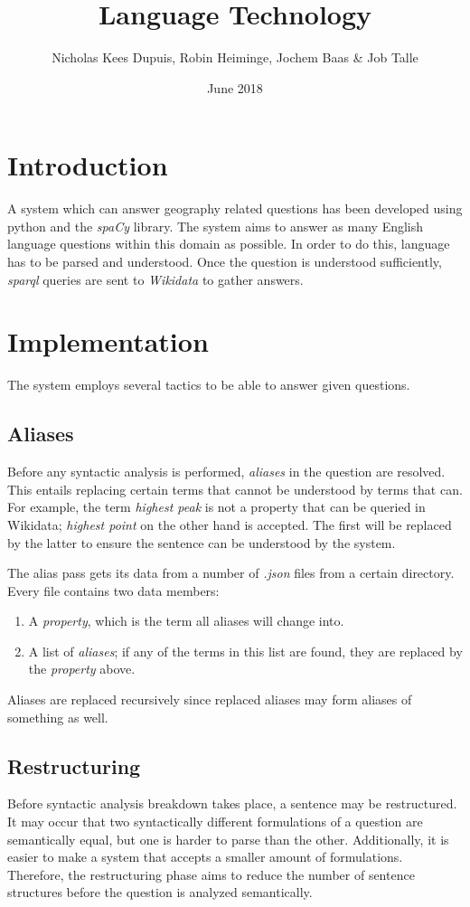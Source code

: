 \documentclass{article}
\title{Language Technology}
\author{Nicholas Kees Dupuis, Robin Heiminge, Jochem Baas \& Job Talle}
\date{June 2018}
\begin{document}
\maketitle

\section{Introduction}
A system which can answer geography related questions has been developed using python and the \emph{spaCy} library. The system aims to answer as many English language questions within this domain as possible. In order to do this, language has to be parsed and understood. Once the question is understood sufficiently, \emph{sparql} queries are sent to \emph{Wikidata} to gather answers.

\section{Implementation}
The system employs several tactics to be able to answer given questions.

\subsection{Aliases}
Before any syntactic analysis is performed, \emph{aliases} in the question are resolved. This entails replacing certain terms that cannot be understood by terms that can. For example, the term \emph{highest peak} is not a property that can be queried in Wikidata; \emph{highest point} on the other hand is accepted. The first will be replaced by the latter to ensure the sentence can be understood by the system.

The alias pass gets its data from a number of \emph{.json} files from a certain directory. Every file contains two data members:

\begin{enumerate}
    \item A \emph{property}, which is the term all aliases will change into.
    \item A list of \emph{aliases}; if any of the terms in this list are found, they are replaced by the \emph{property} above.
\end{enumerate}

Aliases are replaced recursively since replaced aliases may form aliases of something as well.

\subsection{Restructuring}
Before syntactic analysis breakdown takes place, a sentence may be restructured. It may occur that two syntactically different formulations of a question are semantically equal, but one is harder to parse than the other. Additionally, it is easier to make a system that accepts a smaller amount of formulations. Therefore, the restructuring phase aims to reduce the number of sentence structures before the question is analyzed semantically.
\end{document}
